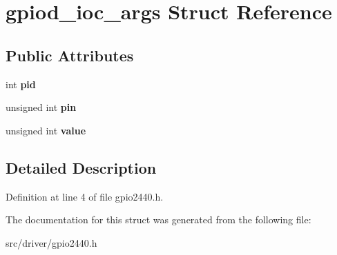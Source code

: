 \hypertarget{structgpiod__ioc__args}{\section{gpiod\-\_\-ioc\-\_\-args \-Struct \-Reference}
\label{structgpiod__ioc__args}
}
\subsection*{\-Public \-Attributes}
\begin{DoxyCompactItemize}
\item 
\hypertarget{structgpiod__ioc__args_a20ea304329455b464a0e12ca1caa237b}{int {\bfseries pid}}\label{structgpiod__ioc__args_a20ea304329455b464a0e12ca1caa237b}

\item 
\hypertarget{structgpiod__ioc__args_afdbbb73a282759c017e318e20e0cdfe4}{unsigned int {\bfseries pin}}\label{structgpiod__ioc__args_afdbbb73a282759c017e318e20e0cdfe4}

\item 
\hypertarget{structgpiod__ioc__args_a2cc2eb135fea1cbeef461f0908aa2225}{unsigned int {\bfseries value}}\label{structgpiod__ioc__args_a2cc2eb135fea1cbeef461f0908aa2225}

\end{DoxyCompactItemize}


\subsection{\-Detailed \-Description}


\-Definition at line 4 of file gpio2440.\-h.



\-The documentation for this struct was generated from the following file\-:\begin{DoxyCompactItemize}
\item 
src/driver/gpio2440.\-h\end{DoxyCompactItemize}
